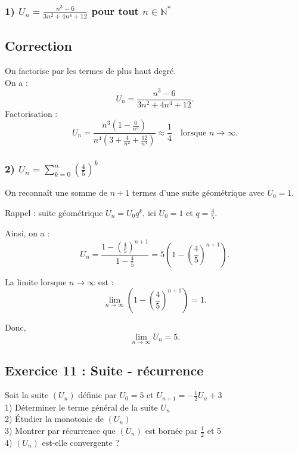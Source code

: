 \documentclass[a4paper, 12pt]{article}
\begin{document}
{{\subsubsection*{1) \( U_n = \frac{n^3 - 6}{3n^2 + 4n^4 + 12} \) pour tout \( n \in \mathbb{N}^* \)}

\subsection*{Correction}
On factorise par les termes de plus haut degré. \\
On a :
\[
U_n = \frac{n^3 - 6}{3n^2 + 4n^4 + 12}.
\]
Factorisation :
\[
U_n = \frac{n^3(1 - \frac{6}{n^3})}{n^4(3 + \frac{4}{n^2} + \frac{12}{n^4})} \approx \frac{1}{4} \quad \text{lorsque } n \to \infty.
\]

\subsubsection*{2) \( U_n = \sum_{k=0}^{n} \left( \frac{4}{5} \right)^k \)}

On reconnaît une somme de \( n+1 \) termes d'une suite géométrique avec \( U_0 = 1 \). 

Rappel : suite géométrique \( U_n = U_0 q^k \), ici \( U_0 = 1 \) et \( q = \frac{4}{5} \).

Ainsi, on a :
\[
U_n = \frac{1 - \left( \frac{4}{5} \right)^{n+1}}{1 - \frac{4}{5}} = 5 \left( 1 - \left( \frac{4}{5} \right)^{n+1} \right).
\]

La limite lorsque \( n \to \infty \) est :
\[
\lim_{n \to \infty} \left( 1 - \left( \frac{4}{5} \right)^{n+1} \right) = 1.
\]

Donc, 
\[
\lim_{n \to \infty} U_n = 5.
\]

\subsection*{Exercice 11 : Suite - récurrence}

Soit la suite \( (U_n) \) définie par \( U_0 = 5 \) et \( U_{n+1} = -\frac{1}{2} U_n + 3 \)\\

1) Déterminer le terme général de la suite \( U_n \)\\
2) Étudier la monotonie de \( (U_n) \)\\
3) Montrer par récurrence que \( (U_n) \) est bornée par \( \frac{1}{2} \) et 5\\
4) \( (U_n) \) est-elle convergente ?\\

}}
\end{document}
